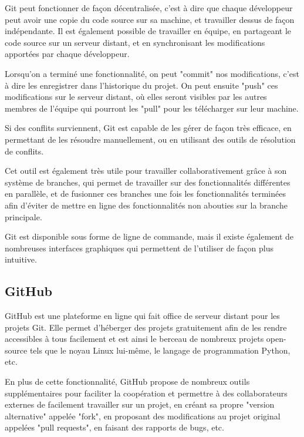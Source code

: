 \documentclass[12pt]{scrreprt} %
\begin{document}
Git peut fonctionner de façon décentralisée, c'est à dire que chaque développeur peut avoir une copie du code source sur sa machine, et travailler dessus de façon indépendante. Il est également possible de travailler en équipe, en partageant le code source sur un serveur distant, et en synchronisant les modifications apportées par chaque développeur.

Lorsqu'on a terminé une fonctionnalité, on peut "commit" nos modifications, c'est à dire les enregistrer dans l'historique du projet. On peut ensuite "push" ces modifications sur le serveur distant, où elles seront visibles par les autres membres de l'équipe qui pourront les "pull" pour les télécharger sur leur machine.

Si des conflits surviennent, Git est capable de les gérer de façon très efficace, en permettant de les résoudre manuellement, ou en utilisant des outils de résolution de conflits.

Cet outil est également très utile pour travailler collaborativement grâce à son système de branches, qui permet de travailler sur des fonctionnalités différentes en parallèle, et de fusionner ces branches une fois les fonctionnalités terminées afin d'éviter de mettre en ligne des fonctionnalités non abouties sur la branche principale.

Git est disponible sous forme de ligne de commande, mais il existe également de nombreuses interfaces graphiques qui permettent de l'utiliser de façon plus intuitive.

\subsection{GitHub}

GitHub est une plateforme en ligne qui fait office de serveur distant pour les projets Git. Elle permet d'héberger des projets gratuitement afin de les rendre accessibles à tous facilement et est ainsi le berceau de nombreux projets open-source tels que le noyau Linux lui-même\cite{LinuxGithub2024}, le langage de programmation Python\cite{PythonGithub2024}, etc.

En plus de cette fonctionnalité, GitHub propose de nombreux outils supplémentaires pour faciliter la coopération et permettre à des collaborateurs externes de facilement travailler sur un projet, en créant sa propre "version alternative" appelée "fork", en proposant des modifications au projet original appelées "pull requests", en faisant des rapports de bugs, etc.
\end{document}
